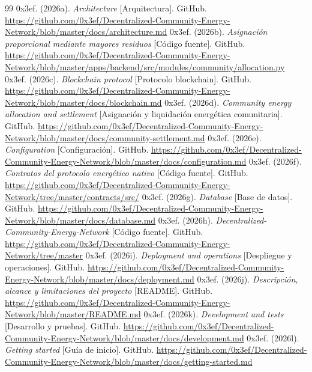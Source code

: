 \begin{thebibliography}{99}
 0x3ef. (2026a). \textit{Architecture} [Arquitectura]. GitHub. \url{https://github.com/0x3ef/Decentralized-Community-Energy-Network/blob/master/docs/architecture.md}
 0x3ef. (2026b). \textit{Asignación proporcional mediante mayores residuos} [Código fuente]. GitHub. \url{https://github.com/0x3ef/Decentralized-Community-Energy-Network/blob/master/apps/backend/src/modules/community/allocation.py}
 0x3ef. (2026c). \textit{Blockchain protocol} [Protocolo blockchain]. GitHub. \url{https://github.com/0x3ef/Decentralized-Community-Energy-Network/blob/master/docs/blockchain.md}
 0x3ef. (2026d). \textit{Community energy allocation and settlement} [Asignación y liquidación energética comunitaria]. GitHub. \url{https://github.com/0x3ef/Decentralized-Community-Energy-Network/blob/master/docs/community-settlement.md}
 0x3ef. (2026e). \textit{Configuration} [Configuración]. GitHub. \url{https://github.com/0x3ef/Decentralized-Community-Energy-Network/blob/master/docs/configuration.md}
 0x3ef. (2026f). \textit{Contratos del protocolo energético nativo} [Código fuente]. GitHub. \url{https://github.com/0x3ef/Decentralized-Community-Energy-Network/tree/master/contracts/src/}
 0x3ef. (2026g). \textit{Database} [Base de datos]. GitHub. \url{https://github.com/0x3ef/Decentralized-Community-Energy-Network/blob/master/docs/database.md}
 0x3ef. (2026h). \textit{Decentralized-Community-Energy-Network} [Código fuente]. GitHub. \url{https://github.com/0x3ef/Decentralized-Community-Energy-Network/tree/master}
 0x3ef. (2026i). \textit{Deployment and operations} [Despliegue y operaciones]. GitHub. \url{https://github.com/0x3ef/Decentralized-Community-Energy-Network/blob/master/docs/deployment.md}
 0x3ef. (2026j). \textit{Descripción, alcance y limitaciones del proyecto} [README]. GitHub. \url{https://github.com/0x3ef/Decentralized-Community-Energy-Network/blob/master/README.md}
 0x3ef. (2026k). \textit{Development and tests} [Desarrollo y pruebas]. GitHub. \url{https://github.com/0x3ef/Decentralized-Community-Energy-Network/blob/master/docs/development.md}
 0x3ef. (2026l). \textit{Getting started} [Guía de inicio]. GitHub. \url{https://github.com/0x3ef/Decentralized-Community-Energy-Network/blob/master/docs/getting-started.md}

\end{thebibliography}
